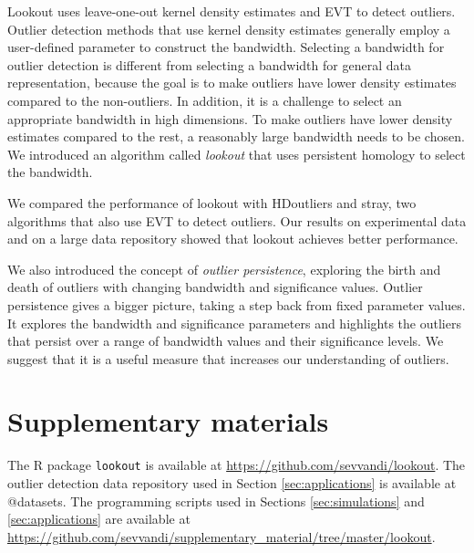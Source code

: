 \documentclass[
]{article}
\begin{document}
Lookout uses leave-one-out kernel density estimates and EVT to detect
outliers. Outlier detection methods that use kernel density estimates
generally employ a user-defined parameter to construct the bandwidth.
Selecting a bandwidth for outlier detection is different from selecting
a bandwidth for general data representation, because the goal is to make
outliers have lower density estimates compared to the non-outliers. In
addition, it is a challenge to select an appropriate bandwidth in high
dimensions. To make outliers have lower density estimates compared to
the rest, a reasonably large bandwidth needs to be chosen. We introduced
an algorithm called \emph{lookout} that uses persistent homology to
select the bandwidth.

We compared the performance of lookout with HDoutliers and stray, two
algorithms that also use EVT to detect outliers. Our results on
experimental data and on a large data repository showed that lookout
achieves better performance.

We also introduced the concept of \emph{outlier persistence}, exploring
the birth and death of outliers with changing bandwidth and significance
values. Outlier persistence gives a bigger picture, taking a step back
from fixed parameter values. It explores the bandwidth and significance
parameters and highlights the outliers that persist over a range of
bandwidth values and their significance levels. We suggest that it is a
useful measure that increases our understanding of outliers.

\hypertarget{sec:suppmat}{%
\section{Supplementary materials}\label{sec:suppmat}}

The R package \texttt{lookout} is available at
\url{https://github.com/sevvandi/lookout}. The outlier detection data
repository used in Section \ref{sec:applications} is available at
@datasets. The programming scripts used in Sections
\ref{sec:simulations} and \ref{sec:applications} are available at
\url{https://github.com/sevvandi/supplementary_material/tree/master/lookout}.
\end{document}
